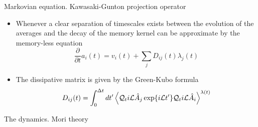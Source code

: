 \documentclass{beamer}
\begin{document}
\begin{frame}{Markovian equation. Kawasaki-Gunton projection operator}
  \begin{itemize}
     \item Whenever a clear separation of timescales exists between the evolution of the averages and the decay of the memory kernel can be approximate by the memory-less equation
\begin{equation}
  \frac{\partial}{\partial t}a_i(t) = v_i(t) + \sum_j D_{ij}(t) \lambda_j(t)
\label{ex2}
\nonumber
\end{equation}
\item The  dissipative matrix  is  given  by  the Green-Kubo  formula
\begin{equation}
D_{ij}(t)=\int_0^{\Delta t} dt'\left\langle 
{\cal Q}_t i{\cal L}\hat{A}_j\exp\{i{\cal L}t'\}{\cal Q}_t i{\cal L}\hat{A}_i
\right\rangle^{\lambda(t)}
\label{dij}
\nonumber
\end{equation}
\end{itemize}
\end{frame}

\begin{frame}{The dynamics. Mori theory}

\end{frame}
\end{document}
